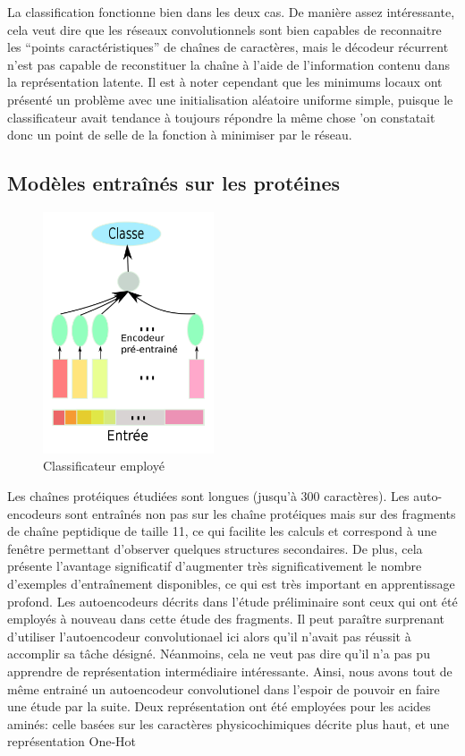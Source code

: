 \documentclass[a4paper, journal, 11pt, onecolumn]{IEEEtran}
\begin{document}
La classification fonctionne bien dans les deux cas. De manière assez
intéressante, cela veut dire que les réseaux convolutionnels sont bien capables
de reconnaitre les ``points caractéristiques'' de chaînes de caractères, mais le
décodeur récurrent n'est pas capable de reconstituer la chaîne à l'aide de
l'information contenu dans la représentation latente. Il est à noter cependant
que les minimums locaux ont présenté un problème avec une initialisation
aléatoire uniforme simple, puisque le classificateur avait tendance à toujours
répondre la même chose 'on constatait donc un point de selle de la fonction à
minimiser par le réseau.

\subsection{Modèles entraînés sur les protéines}

\begin{figure}
  \includegraphics[width=0.45\textwidth]{Class}
  \caption{Classificateur employé}
\end{figure}

Les chaînes protéiques étudiées sont longues (jusqu'à 300 caractères). Les
auto-encodeurs sont entraînés non pas sur les chaîne protéiques mais sur des
fragments de chaîne peptidique de taille 11, ce qui facilite les calculs et
correspond à une fenêtre permettant d'observer quelques structures secondaires.
De plus, cela présente l'avantage significatif d'augmenter très
significativement le nombre d'exemples d'entraînement disponibles, ce qui est
très important en apprentissage profond. Les autoencodeurs décrits dans l'étude
préliminaire sont ceux qui ont été employés à nouveau dans cette étude des
fragments. Il peut paraître surprenant d'utiliser l'autoencodeur convolutionael
ici alors qu'il n'avait pas réussit à accomplir sa tâche désigné. Néanmoins,
cela ne veut pas dire qu'il n'a pas pu apprendre de représentation intermédiaire
intéressante. Ainsi, nous avons tout de même entrainé un autoencodeur
convolutionel dans l'espoir de pouvoir en faire une étude par la suite. Deux
représentation ont été employées pour les acides aminés: celle basées sur les
caractères physicochimiques décrite plus haut, et une représentation One-Hot
\end{document}
